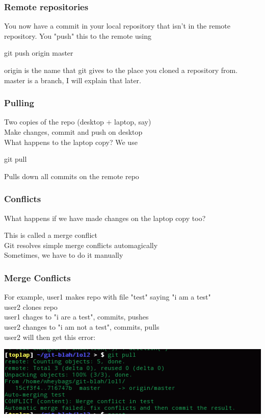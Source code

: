 \documentclass[xcolor=dvipsnames]{beamer}
\begin{document}
\begin{frame}
    \frametitle{Remote repositories}

    You now have a commit in your local repository that isn't in the remote repository.
    You "push" this to the remote using
    \begin{block}{}
        git push origin master
    \end{block}
    
    origin is the name that git gives to the place you cloned a repository from.\\
    master is a branch, I will explain that later.

\end{frame}

\begin{frame}
    \frametitle{Pulling}

    Two copies of the repo (desktop + laptop, say)\\
    Make changes, commit and push on desktop\\\vbox{}
    What happens to the laptop copy? We use
    \begin{block}{}
        git pull
    \end{block}
    Pulls down all commits on the remote repo
\end{frame}

\begin{frame}
    \frametitle{Conflicts}

    What happens if we have made changes on the laptop copy too?\\\vbox{}
    
    This is called a merge conflict\\
    Git resolves simple merge conflicts automagically\\
    Sometimes, we have to do it manually\\
\end{frame}

\begin{frame}
    \frametitle{Merge Conflicts}

    For example, user1 makes repo with file "test" saying "i am a test"\\
    user2 clones repo\\
    user1 chages to "i are a test", commits, pushes\\
    user2 changes to "i am not a test", commits, pulls\\

    user2 will then get this error:
    \begin{center}
        \includegraphics[scale=0.4]{mergeconflict1.png}
    \end{center}
\end{frame}
\end{document}
